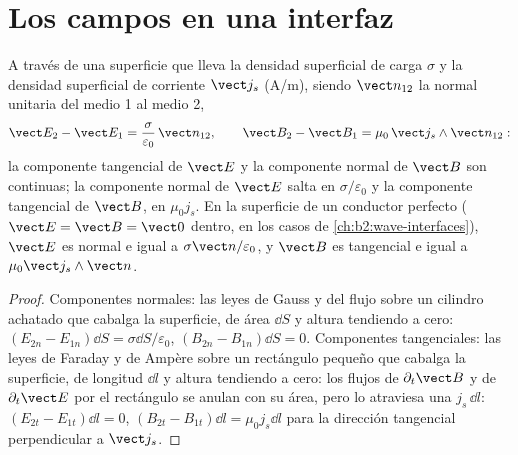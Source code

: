 \section{Los campos en una interfaz}

\begin{proposition}\label{prop:b2:maxwell-equations:boundary}
A través de una superficie que lleva la densidad superficial de carga $\sigma$ y la
densidad superficial de corriente $\vect j_s$ (\unit{A/m}), siendo $\vect n_{12}$ la normal
unitaria del medio 1 al medio 2,
\[
\vect E_2 - \vect E_1 = \frac\sigma{\varepsilon_0}\,\vect n_{12} , \qquad
\vect B_2 - \vect B_1 = \mu_0\,\vect j_s\wedge\vect n_{12} :
\]
la componente tangencial de $\vect E$ y la componente normal de $\vect B$ son
continuas; la componente normal de $\vect E$ salta en $\sigma/\varepsilon_0$ y la
componente tangencial de $\vect B$, en $\mu_0j_s$. En la superficie de un
conductor perfecto ($\vect E = \vect B = \vect 0$ dentro, en los casos de
\cref{ch:b2:wave-interfaces}), $\vect E$ es normal e igual a $\sigma\vect n/
\varepsilon_0$, y $\vect B$ es tangencial e igual a $\mu_0\vect j_s\wedge\vect n$.
\end{proposition}

\begin{proof}
Componentes normales: las leyes de Gauss y del flujo sobre un cilindro
achatado que cabalga la superficie, de área $\dd S$ y altura tendiendo a cero: $(E_{2n}
- E_{1n})\dd S = \sigma\dd S/\varepsilon_0$, $(B_{2n} - B_{1n})\dd S = 0$. Componentes
tangenciales: las leyes de Faraday y de Ampère sobre un rectángulo pequeño
que cabalga la superficie, de longitud $\dd l$ y altura tendiendo a cero: los
flujos de $\partial_t\vect B$ y de $\partial_t\vect E$ por el rectángulo se anulan con
su área, pero lo atraviesa una  $j_s\,\dd l$:
$(E_{2t} - E_{1t})\dd l = 0$, $(B_{2t} - B_{1t})\dd l = \mu_0j_s\dd l$ para la
dirección tangencial perpendicular a $\vect j_s$.
\end{proof}

